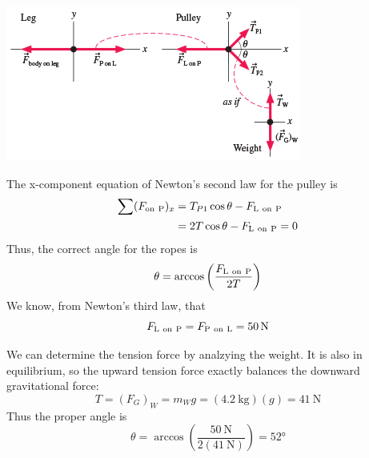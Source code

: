 \begin{Answer}
    \begin{center}
        \includegraphics[totalheight=0.2\textheight]{../figures/leg-in-traction-model.png}
        \label{fig:leg-in-traction-model}
    \end{center}

    The x-component equation of Newton's second law for the pulley is
    \begin{align}
        \sum (F_{\mathrm{on~P}})_x &= T_{P1}\cos\theta -F_{\mathrm{L~on~P}}
        \\
        &= 2T\cos\theta - F_{\mathrm{L~on~P}} = 0
    \end{align}
    Thus, the correct angle for the ropes is
    \begin{equation}
        \theta = \arccos \left(\frac{F_{\mathrm{L~on~P}}}{2T}\right)
    \end{equation}
    We know, from Newton's third law, that
    \begin{equation}
        F_{\mathrm{L~on~P}} = F_{\mathrm{P~on~L}} = \qty{50}{\newton}
    \end{equation}

    We can determine the tension force by analzying the weight.  It is
    also in equilibrium, so the upward tension force exactly balances
    the downward gravitational force:
    \begin{equation}
        T = (F_G)_W = m_Wg = (\qty{4.2}{\kilo\gram})(g) = \qty{41}{\newton}
    \end{equation}
    Thus the proper angle is
    \begin{equation}
        \theta = \arccos \left( \frac{\qty{50}{\newton}}{2(\qty{41}{\newton})}\right)=\ang
        {52}
    \end{equation}
\end{Answer}

